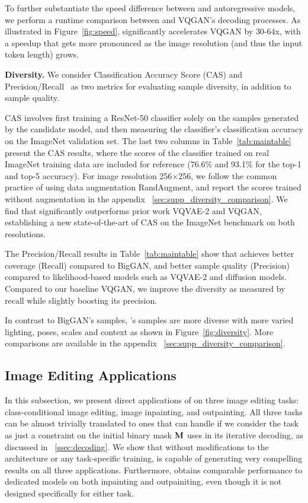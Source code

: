 To further substantiate the speed difference between \model and autoregressive models, we perform a runtime comparison between \model and VQGAN's decoding processes. As illustrated in Figure~\ref{fig:speed}, \model significantly accelerates VQGAN by $30$-$64$x, with a speedup that gets more pronounced as the image resolution (and thus the input token length) grows.

\noindent\textbf{Diversity.} We consider Classification Accuracy Score (CAS) \cite{Ravuri19CAS} and Precision/Recall~\cite{KynkaanniemiKLL19} as two metrics for evaluating sample diversity, in addition to sample quality.

CAS involves first training a ResNet-50 classifier\cite{ResNet} solely on the samples generated by the candidate model, and then measuring the classifier's classification accuracy on the ImageNet validation set.
The last two columns in Table~\ref{tab:maintable} present the CAS results, where the scores of the classifier trained on real ImageNet training data are included for reference (76.6\% and 93.1\% for the top-1 and top-5 accuracy). For image resolution 256$\times$256,  we follow the common practice of using data augmentation RandAugment\cite{cubuk2019randaugment}, and report the scores trained without augmentation in the appendix ~\ref{sec:supp_diversity_comparison}. We find that \model significantly outperforms prior work VQVAE-2 and VQGAN, establishing a new state-of-the-art of CAS on the ImageNet benchmark on both resolutions.

The Precision/Recall results in Table~\ref{tab:maintable} show that \model achieves better coverage (Recall) compared to BigGAN, and better sample quality (Precision) compared to likelihood-based models such as VQVAE-2 and diffusion models. Compared to our baseline VQGAN, we improve the diversity as measured by recall while slightly boosting its precision. 

In contrast to BigGAN’s samples, \model's samples are more diverse with more varied lighting, poses, scales and context as shown in Figure~\ref{fig:diversity}. More comparisons are available in the appendix ~\ref{sec:supp_diversity_comparison}.

\subsection{Image Editing Applications}
\label{ssec:applications}
In this subsection, we present direct applications of \model on three image editing tasks: class-conditional image editing, image inpainting, and outpainting. All three tasks can be almost trivially translated to ones that \model can handle if we consider the task as just a constraint on the initial binary mask ${\mathbf{M}}$ \model uses in its iterative decoding, as discussed in ~\ref{ssec:decoding}. We show that without modifications to the architecture or any task-specific training, \model is capable of generating very compelling results on all three applications. Furthermore, \model obtains comparable performance to dedicated models on both inpainting and outpainiting, even though it is not designed specifically for either task.

